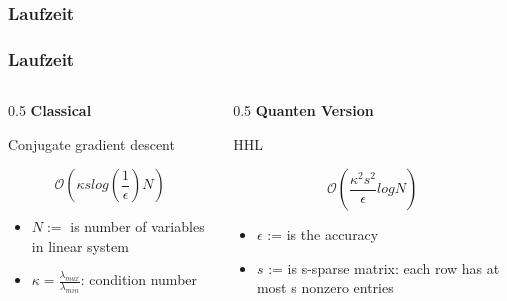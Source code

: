\subsubsection{Laufzeit}
\begin{frame}
    \frametitle{Laufzeit}
    \begin{columns}[c]
        \begin{column}{0.5\hsize}
            \textbf{Classical}

            \hfil

            Conjugate gradient descent 

            $$ \mathcal{O}(\kappa s log{\left(\frac 1 \epsilon\right)} N ) $$


            \hfil

            \begin{itemize}
            \item $N :=$ is number of variables in linear system
            \item $\kappa= \frac {\lambda_{max}} {\lambda_{min}}$:  condition number
            \end{itemize}

        \end{column}
        

        \begin{column}{0.5\hsize}
            \textbf{Quanten Version}

            \hfil

            HHL

            $$ \mathcal{O}(\frac{\kappa^2s^2}{\epsilon}logN) $$

            \hfil

            \begin{itemize}
            \item $\epsilon$ := is the accuracy                                                            
            \item $s$ := is s-sparse matrix: each row has at most s nonzero entries
            \end{itemize}

        \end{column}
    \end{columns}
 
    \hfil



\end{frame}


